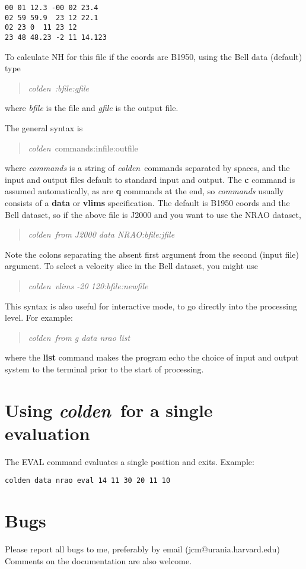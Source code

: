 \documentclass[12pt]{article}
\newcommand{\pr}{{\it colden}~}
\begin{document}
\begin{verbatim}
00 01 12.3 -00 02 23.4
02 59 59.9  23 12 22.1
02 23 0  11 23 12
23 48 48.23 -2 11 14.123
\end{verbatim}

To calculate NH for this file if the coords are B1950, using the Bell data
(default)
type \begin{quote} \pr {\it :bfile:gfile}\end{quote}
where {\it bfile} is the file and {\it gfile} is the output file.

The general syntax is 
\begin{quote} \pr  commands:infile:outfile \end{quote}
where {\it commands} is a string of \pr commands separated
by spaces, and the input and output files default to 
standard input and output. The {\bf c} command is assumed automatically,
as are {\bf q} commands at the end, so {\it commands} usually
consists of a {\bf data} or {\bf vlims} specification. 
The default is B1950 coords and the Bell dataset,
so if the above file is J2000 and you want to use the NRAO dataset,
\begin{quote} \pr {\it from J2000 data NRAO:bfile:jfile}\end{quote}
Note the colons separating the absent first
argument from the second (input file) argument.
To select a velocity slice in the Bell dataset, you might use
\begin{quote} \pr {\it vlims -20 120:bfile:newfile}\end{quote}


This syntax is also useful for interactive mode, to go directly into
the processing level. For example:
\begin{quote} \pr {\it from g data nrao list}\end{quote}
where the {\bf list} command makes the program echo
the choice of input and output system to the terminal prior to
the start of processing.


\section{Using \pr for a single evaluation}

The EVAL command evaluates a single position and exits.
Example:
\begin{verbatim}
colden data nrao eval 14 11 30 20 11 10
\end{verbatim}

\section{Bugs}

Please report all bugs to me, preferably by email (jcm@urania.harvard.edu)
Comments on the documentation are also welcome.
\end{document}
